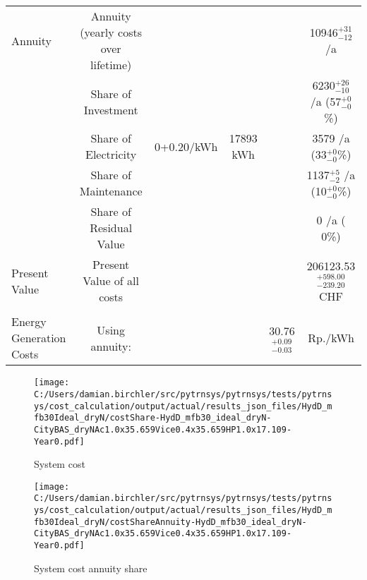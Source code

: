 \documentclass[english]{SPFShortReport}
\begin{document}
\begin{table}[!ht]
\begin{adjustbox}{max width =\textwidth}
\begin{tabular}{l | c c c c c }
Annuity & Annuity (yearly costs over lifetime)  &&& & 10946$^{\mathrm{+31}}_{\mathrm{-12}}$ /a  \\
 & Share of Investment & &&& 6230$^{\mathrm{+26}}_{\mathrm{-10}}$ /a (57$^{\mathrm{+ 0}}_{\mathrm{- 0}}$\%) \\
 & Share of Electricity & 0+0.20/kWh & 17893 kWh &  & 3579 /a (33$^{\mathrm{+ 0}}_{\mathrm{- 0}}$\%)\\
 & Share of Maintenance & &&& 1137$^{\mathrm{+ 5}}_{\mathrm{- 2}}$ /a (10$^{\mathrm{+ 0}}_{\mathrm{- 0}}$\%)\\ 
 & Share of Residual Value &&& &  0 /a ( 0\%)\\
Present Value  & Present Value of all costs  & &&& 206123.53$^{\mathrm{+598.00}}_{\mathrm{-239.20}}$ CHF \\
\hline \\ 
 Energy Generation Costs & Using annuity: &&& 30.76$^{\mathrm{+0.09}}_{\mathrm{-0.03}}$ & Rp./kWh \\
\hline
\hline
\end{tabular}
\end{adjustbox}
\label{CostsTable}
\end{table}
\begin{figure}[!htbp]
\begin{center}
\texttt{[image: C:/Users/damian.birchler/src/pytrnsys/pytrnsys/tests/pytrnsys/cost\_calculation/output/actual/results\_json\_files/HydD\_mfb30Ideal\_dryN/costShare-HydD\_mfb30\_ideal\_dryN-CityBAS\_dryNAc1.0x35.659Vice0.4x35.659HP1.0x17.109-Year0.pdf]}
\caption{System cost}
\label{systemCost}
\end{center}
\end{figure}
\begin{figure}[!htbp]
\begin{center}
\texttt{[image: C:/Users/damian.birchler/src/pytrnsys/pytrnsys/tests/pytrnsys/cost\_calculation/output/actual/results\_json\_files/HydD\_mfb30Ideal\_dryN/costShareAnnuity-HydD\_mfb30\_ideal\_dryN-CityBAS\_dryNAc1.0x35.659Vice0.4x35.659HP1.0x17.109-Year0.pdf]}
\caption{System cost annuity share}
\label{systemCostannuity}
\end{center}
\end{figure}
\end{document}
